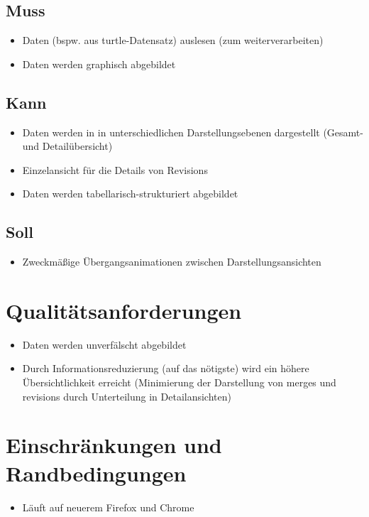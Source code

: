 \documentclass[color, ddc]{tudscrreprt}
\begin{document}
\subsection{Muss}
\begin{itemize}
\item Daten (bspw. aus turtle-Datensatz) auslesen (zum weiterverarbeiten)
\item Daten werden graphisch abgebildet
\end{itemize}

\subsection{Kann}
\begin{itemize}
\item Daten werden in in unterschiedlichen Darstellungsebenen dargestellt (Gesamt- und Detailübersicht)
\item Einzelansicht für die Details von Revisions
\item Daten werden tabellarisch-strukturiert abgebildet
\end{itemize}

\subsection{Soll}
\begin{itemize}
\item Zweckmäßige Übergangsanimationen zwischen Darstellungsansichten
\end{itemize}

\section{Qualitätsanforderungen}
\begin{itemize}
\item Daten werden unverfälscht abgebildet
\item Durch Informationsreduzierung (auf das nötigste) wird ein höhere Übersichtlichkeit erreicht (Minimierung der Darstellung von merges und revisions durch Unterteilung in Detailansichten)
\end{itemize}

\section{Einschränkungen und Randbedingungen}
\begin{itemize}
\item Läuft auf neuerem Firefox und Chrome
\end{itemize}
\end{document}
